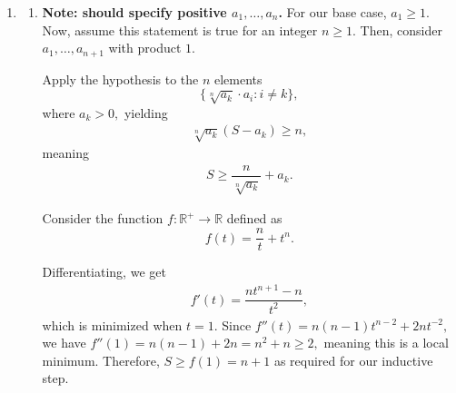 \documentclass[12pt]{article}
\begin{document}
\begin{enumerate}
    WLOG, assume $m \leq n.$ Define
    $N_i = \{i + 1, i + 2, \ldots, i + m\},$
    and consider the sequence constructed as
    $$
    \mathcal S = \{N_n; N_{m -1}; \ldots; N_{1}\}.
    $$
    Since for $j > i,$ all the elements in $N_{j}$ are less than the
    elements in $N_{i},$ the longest increasing subsequence is length
    $m.$ Additionally, since $N_k$ is increasing for any $k,$ any
    decreasing subsequence must have at most one element in each
    $N_k,$ meaning $n$ is the upper bound on the length of a
    decreasing subsequence. Hence, we've constructed $\mathcal S$
    such that it has no increasing subsequence of length $m + 1,$ and
    no decreasing subsequence of length $n + 1.$

    If otherwise, we had $m \geq n,$ we could similarly construct
    decreasing $M_i,$ and append those together for a similar argument.

    Thus, length $mn + 1$ is the smallest length to guarantee that a
    sequence composed of unique real numbers contains an increasing
    subsequence of length $m + 1$, or a decreasing subsequence of
    length $n + 1.$

  \item
    \begin{enumerate}
      \item \textbf{Note: should specify positive $a_1, \ldots, a_n$.}
        For our base case, $a_1 \geq 1.$ Now, assume this statement
        is true for an integer $n \geq 1.$ Then, consider $a_1,
        \ldots, a_{n + 1}$ with product $1.$

        Apply the hypothesis to the $n$ elements
        $$
        \{\sqrt[n]{a_k} \cdot a_i : i \neq k\},
        $$
        where $a_k > 0,$ yielding
        \begin{align*}
          \sqrt[n]{a_k} \left(
            S - a_k
          \right) \geq n,
        \end{align*}
        meaning
        \begin{align*}
          S \geq \dfrac{n}{\sqrt[n]{a_k}} + a_k.
        \end{align*}

        Consider the function $f: \mathbb R^{+} \to \mathbb R$
        defined as $$f(t)  = \dfrac{n}{t} + t^n .$$

        Differentiating, we get
        \begin{align*}
          f'(t) = \dfrac{nt^{n + 1} - n}{t^2},
        \end{align*}
        which is minimized when $t = 1.$ Since $f''(t) =
        n(n-1)t^{n-2} + 2nt^{-2},$ we have $f''(1) = n(n-1) + 2n =
        n^2 + n \geq 2,$ meaning this is a local minimum. Therefore,
        $S \geq f(1) = n + 1$ as required for our inductive step.


\end{enumerate}
\end{enumerate}
\end{document}
